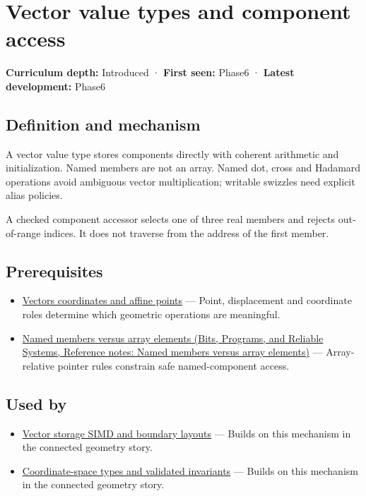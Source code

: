 \hypertarget{appendix-37a39984ba66}{}\label{referencestart:appendix-37a39984ba66}
\section{Vector value types and component access}\label{appendix-37a39984ba66-vector-value-types-and-component-access}

\textbf{Curriculum depth:} Introduced · \textbf{First seen:} Phase6 · \textbf{Latest development:} Phase6

\subsection{Definition and mechanism}\label{appendix-37a39984ba66-definition-and-mechanism}

A vector value type stores components directly with coherent arithmetic and initialization. Named members are not an array. Named dot, cross and Hadamard operations avoid ambiguous vector multiplication; writable swizzles need explicit alias policies.

A checked component accessor selects one of three real members and rejects out-of-range indices. It does not traverse from the address of the first member.

\subsection{Prerequisites}\label{appendix-37a39984ba66-prerequisites}

\begin{itemize}
\tightlist
\item
  \hyperref[appendix-0659864c0aa3]{Vectors coordinates and affine points} --- Point, displacement and coordinate roles determine which geometric operations are meaningful.
\item
  \href{../01-Bits-Programs-and-Reliable-Systems/main.pdf\#nameddest=appendix-3f7e15effba6}{Named members versus array elements (Bits, Programs, and Reliable Systems, Reference notes: Named members versus array elements)} --- Array-relative pointer rules constrain safe named-component access.
\end{itemize}

\subsection{Used by}\label{appendix-37a39984ba66-used-by}

\begin{itemize}
\tightlist
\item
  \hyperref[appendix-26bf6bf2fb8b]{Vector storage SIMD and boundary layouts} --- Builds on this mechanism in the connected geometry story.
\item
  \hyperref[appendix-380a220e2529]{Coordinate-space types and validated invariants} --- Builds on this mechanism in the connected geometry story.
\end{itemize}

